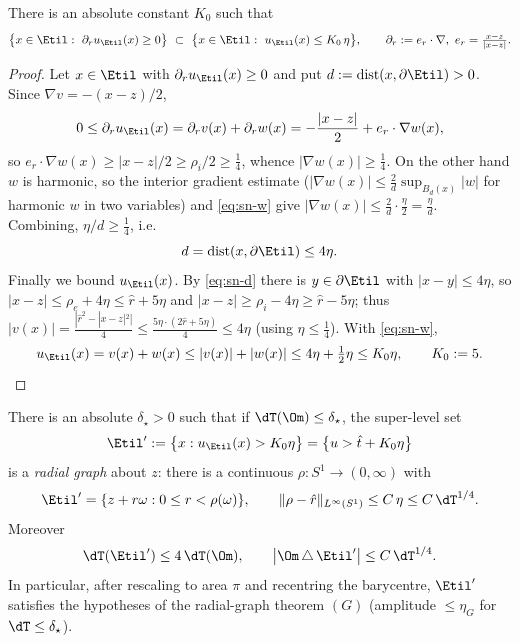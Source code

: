 \begin{lemma}\label{lem:shallow}
There is an absolute constant $K_0$ such that
\begin{equation}\label{eq:sn-shallow}
   \bigl\{x\in\Etil:\ \partial_r u_{\Etil}(x)\ge0\bigr\}
   \ \subset\ \bigl\{x\in\Etil:\ u_{\Etil}(x)\le K_0\,\eta\bigr\},
   \qquad \partial_r:=e_r\cdot\nabla,\ e_r=\tfrac{x-z}{|x-z|}.
\end{equation}
\end{lemma}

\begin{proof}
Let $x\in\Etil$ with $\partial_r u_{\Etil}(x)\ge0$ and put
$d:=\operatorname{dist}(x,\partial\Etil)>0$. Since $\nabla v=-(x-z)/2$,
\[
   0\le\partial_r u_{\Etil}(x)=\partial_r v(x)+\partial_r w(x)
   =-\frac{|x-z|}{2}+e_r\cdot\nabla w(x),
\]
so $e_r\cdot\nabla w(x)\ge|x-z|/2\ge\rho_i/2\ge\tfrac14$, whence
$|\nabla w(x)|\ge\tfrac14$. On the other hand $w$ is harmonic, so the
interior gradient estimate \textup{(}$|\nabla w(x)|\le\frac{2}{d}
\sup_{B_d(x)}|w|$ for harmonic $w$ in two variables\textup{)} and
\eqref{eq:sn-w} give $|\nabla w(x)|\le\frac{2}{d}\cdot\frac{\eta}{2}
=\frac{\eta}{d}$. Combining, $\eta/d\ge\tfrac14$, i.e.
\begin{equation}\label{eq:sn-d}
   d=\operatorname{dist}(x,\partial\Etil)\le 4\eta .
\end{equation}
Finally we bound $u_{\Etil}(x)$. By \eqref{eq:sn-d} there is
$y\in\partial\Etil$ with $|x-y|\le4\eta$, so $|x-z|\le\rho_e+4\eta\le
\hat r+5\eta$ and $|x-z|\ge\rho_i-4\eta\ge\hat r-5\eta$; thus
$|v(x)|=\frac{|\hat r^2-|x-z|^2|}{4}\le\frac{5\eta\cdot(2\hat r+5\eta)}{4}
\le 4\eta$ (using $\eta\le\tfrac14$). With \eqref{eq:sn-w},
\[
   u_{\Etil}(x)=v(x)+w(x)\le|v(x)|+|w(x)|\le4\eta+\tfrac12\eta\le K_0\eta,
   \qquad K_0:=5 .
\]
\end{proof}

\begin{theorem}\label{thm:smallnorm}
There is an absolute $\delta_\star>0$ such that if $\dT(\Om)\le\delta_\star$,
the super-level set
\[
   \Etil':=\bigl\{x:u_{\Etil}(x)>K_0\eta\bigr\}=\bigl\{u>\hat t+K_0\eta\bigr\}
\]
is a \emph{radial graph} about $z$: there is a continuous
$\rho:S^1\to(0,\infty)$ with
\[
   \Etil'=\{z+r\omega:0\le r<\rho(\omega)\},\qquad
   \|\rho-\hat r\|_{L^\infty(S^1)}\le C\,\eta\le C\,\dT^{1/4}.
\]
Moreover
\[
   \dT(\Etil')\le 4\,\dT(\Om),\qquad
   \bigl|\Om\,\triangle\,\Etil'\bigr|\le C\,\dT^{1/4}.
\]
In particular, after rescaling to area $\pi$ and recentring the barycentre,
$\Etil'$ satisfies the hypotheses of the radial-graph theorem $(G)$
\textup{(}amplitude $\le\eta_G$ for $\dT\le\delta_\star$\textup{)}.
\end{theorem}

